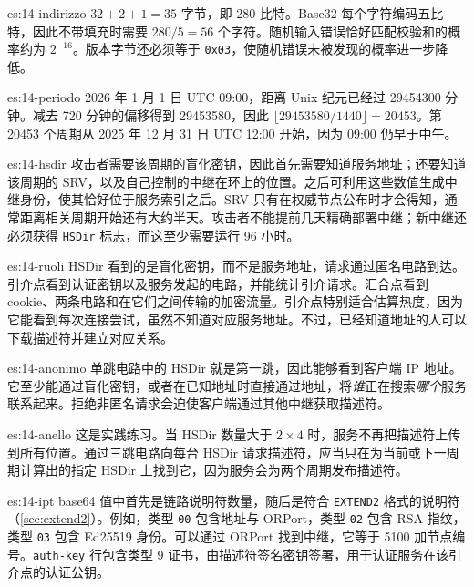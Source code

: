 \begin{soluzione}{es:14-indirizzo}
$32+2+1=35$ 字节，即 280 比特。Base32 每个字符编码五比特，因此不带填充时需要 $280/5=56$ 个字符。随机输入错误恰好匹配校验和的概率约为 $2^{-16}$。版本字节还必须等于 \texttt{0x03}，使随机错误未被发现的概率进一步降低。
\end{soluzione}

\begin{soluzione}{es:14-periodo}
2026 年 1 月 1 日 UTC 09:00，距离 Unix 纪元已经过 \num{29454300} 分钟。减去 720 分钟的偏移得到 \num{29453580}，因此 $\lfloor29453580/1440\rfloor=20453$。第 \num{20453} 个周期从 2025 年 12 月 31 日 UTC 12:00 开始，因为 09:00 仍早于中午。
\end{soluzione}

\begin{soluzione}{es:14-hsdir}
攻击者需要该周期的盲化密钥，因此首先需要知道服务地址；还要知道该周期的 SRV，以及自己控制的中继在环上的位置。之后可利用这些数值生成中继身份，使其恰好位于服务索引之后。SRV 只有在权威节点公布时才会得知，通常距离相关周期开始还有大约半天。攻击者不能提前几天精确部署中继；新中继还必须获得 \texttt{HSDir} 标志，而这至少需要运行 96 小时。
\end{soluzione}

\begin{soluzione}{es:14-ruoli}
HSDir 看到的是盲化密钥，而不是服务地址，请求通过匿名电路到达。引介点看到认证密钥以及服务发起的电路，并能统计引介请求。汇合点看到 cookie、两条电路和在它们之间传输的加密流量。引介点特别适合估算热度，因为它能看到每次连接尝试，虽然不知道对应服务地址。不过，已经知道地址的人可以下载描述符并建立对应关系。
\end{soluzione}

\begin{soluzione}{es:14-anonimo}
单跳电路中的 HSDir 就是第一跳，因此能够看到客户端 IP 地址。它至少能通过盲化密钥，或者在已知地址时直接通过地址，将\emph{谁}正在搜索\emph{哪个}服务联系起来。拒绝非匿名请求会迫使客户端通过其他中继获取描述符。
\end{soluzione}

\begin{soluzione}{es:14-anello}
这是实践练习。当 HSDir 数量大于 $2\times4$ 时，服务不再把描述符上传到所有位置。通过三跳电路向每台 HSDir 请求描述符，应当只在为当前或下一周期计算出的指定 HSDir 上找到它，因为服务会为两个周期发布描述符。
\end{soluzione}

\begin{soluzione}{es:14-ipt}
base64 值中首先是链路说明符数量，随后是符合 \texttt{EXTEND2} 格式的说明符（\cref{sec:extend2}）。例如，类型 \texttt{00} 包含地址与 ORPort，类型 \texttt{02} 包含 RSA 指纹，类型 \texttt{03} 包含 Ed25519 身份。可以通过 ORPort 找到中继，它等于 5100 加节点编号。\texttt{auth-key} 行包含类型 9 证书，由描述符签名密钥签署，用于认证服务在该引介点的认证公钥。
\end{soluzione}
